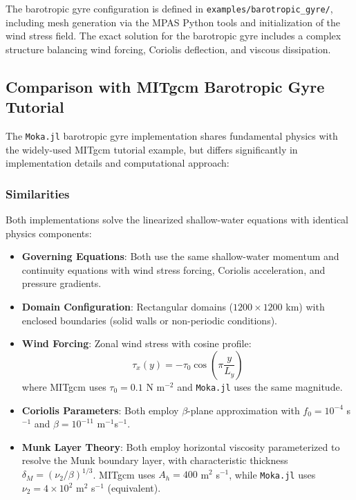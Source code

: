 \documentclass[12pt]{my-preprint}
\begin{document}
The barotropic gyre configuration is defined in \texttt{examples/barotropic\_gyre/}, including mesh generation via the MPAS Python tools and initialization of the wind stress field. The exact solution for the barotropic gyre includes a complex structure balancing wind forcing, Coriolis deflection, and viscous dissipation.

\subsection{Comparison with MITgcm Barotropic Gyre Tutorial}

The \texttt{Moka.jl} barotropic gyre implementation shares fundamental physics with the widely-used MITgcm tutorial example, but differs significantly in implementation details and computational approach:

\subsubsection{Similarities}

Both implementations solve the linearized shallow-water equations with identical physics components:

\begin{itemize}
    \item \textbf{Governing Equations}: Both use the same shallow-water momentum and continuity equations with wind stress forcing, Coriolis acceleration, and pressure gradients.
    
    \item \textbf{Domain Configuration}: Rectangular domains ($1200 \times 1200$ km) with enclosed boundaries (solid walls or non-periodic conditions).
    
    \item \textbf{Wind Forcing}: Zonal wind stress with cosine profile:
    \begin{equation}
        \tau_x(y) = -\tau_0 \cos\left(\pi \frac{y}{L_y}\right)
    \end{equation}
    where MITgcm uses $\tau_0 = 0.1$ N m$^{-2}$ and \texttt{Moka.jl} uses the same magnitude.
    
    \item \textbf{Coriolis Parameters}: Both employ $\beta$-plane approximation with $f_0 = 10^{-4}$ s$^{-1}$ and $\beta = 10^{-11}$ m$^{-1}$s$^{-1}$.
    
    \item \textbf{Munk Layer Theory}: Both employ horizontal viscosity parameterized to resolve the Munk boundary layer, with characteristic thickness $\delta_M = (\nu_2/\beta)^{1/3}$. MITgcm uses $A_h = 400$ m$^2$ s$^{-1}$, while \texttt{Moka.jl} uses $\nu_2 = 4 \times 10^2$ m$^2$ s$^{-1}$ (equivalent).
\end{itemize}
\end{document}
